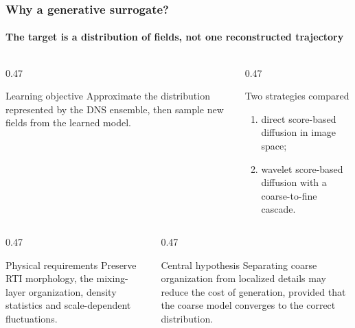 \documentclass[t,10pt,aspectratio=169]{beamer}
\begin{document}
\begin{frame}
  \frametitle{Why a generative surrogate?}
  \framesubtitle{The target is a distribution of fields, not one reconstructed trajectory}
  \begin{columns}[T,onlytextwidth]
    \begin{column}{0.47\textwidth}
      \begin{block}{Learning objective}
        \small Approximate the distribution represented by the DNS ensemble, then sample new fields from the learned model.
      \end{block}
    \end{column}
    \begin{column}{0.47\textwidth}
      \begin{alertblock}{Two strategies compared}
        \small
        \begin{enumerate}
          \item direct score-based diffusion in image space;
          \item wavelet score-based diffusion with a coarse-to-fine cascade.
        \end{enumerate}
      \end{alertblock}
    \end{column}
  \end{columns}
  \vspace{0.7ex}
  \begin{columns}[T,onlytextwidth]
    \begin{column}{0.47\textwidth}
      \begin{block}{Physical requirements}
        \small Preserve RTI morphology, the mixing-layer organization, density statistics and scale-dependent fluctuations.
      \end{block}
    \end{column}
    \begin{column}{0.47\textwidth}
      \begin{exampleblock}{Central hypothesis}
        \small Separating coarse organization from localized details may reduce the cost of generation, provided that the coarse model converges to the correct distribution.
      \end{exampleblock}
    \end{column}
  \end{columns}
\end{frame}
\end{document}

